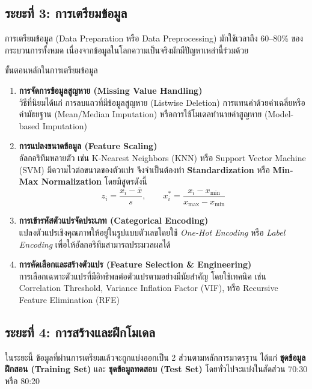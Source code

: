 \subsection{ระยะที่ 3: การเตรียมข้อมูล}
การเตรียมข้อมูล (Data Preparation หรือ Data Preprocessing) มักใช้เวลาถึง 60--80\% ของกระบวนการทั้งหมด เนื่องจากข้อมูลในโลกความเป็นจริงมักมีปัญหาเหล่านี้ร่วมด้วย

\begin{myBox}[]{ขั้นตอนหลักในการเตรียมข้อมูล}{}
\begin{enumerate}
    \item \textbf{การจัดการข้อมูลสูญหาย (Missing Value Handling)} \\
    วิธีที่นิยมได้แก่ การลบแถวที่มีข้อมูลสูญหาย (Listwise Deletion) การแทนค่าด้วยค่าเฉลี่ยหรือค่ามัธยฐาน (Mean/Median Imputation) หรือการใช้โมเดลทำนายค่าสูญหาย (Model-based Imputation)

    \item \textbf{การแปลงขนาดข้อมูล (Feature Scaling)} \\
    อัลกอริทึมหลายตัว เช่น K-Nearest Neighbors (KNN) หรือ Support Vector Machine (SVM) มีความไวต่อขนาดของตัวแปร จึงจำเป็นต้องทำ \textbf{Standardization} หรือ \textbf{Min-Max Normalization} โดยมีสูตรดังนี้
    \[
        z_i = \frac{x_i - \bar{x}}{s}, \qquad
        x_i^{*} = \frac{x_i - x_{\min}}{x_{\max} - x_{\min}}
    \]

    \item \textbf{การเข้ารหัสตัวแปรจัดประเภท (Categorical Encoding)} \\
    แปลงตัวแปรเชิงคุณภาพให้อยู่ในรูปแบบตัวเลขโดยใช้ \textit{One-Hot Encoding} หรือ \textit{Label Encoding} เพื่อให้อัลกอริทึมสามารถประมวลผลได้

    \item \textbf{การคัดเลือกและสร้างตัวแปร (Feature Selection \& Engineering)} \\
    การเลือกเฉพาะตัวแปรที่มีอิทธิพลต่อตัวแปรตามอย่างมีนัยสำคัญ โดยใช้เทคนิค เช่น Correlation Threshold, Variance Inflation Factor (VIF), หรือ Recursive Feature Elimination (RFE)
\end{enumerate}
\end{myBox}

\subsection{ระยะที่ 4: การสร้างและฝึกโมเดล}
ในระยะนี้ ข้อมูลที่ผ่านการเตรียมแล้วจะถูกแบ่งออกเป็น 2 ส่วนตามหลักการมาตรฐาน ได้แก่ \textbf{ชุดข้อมูลฝึกสอน (Training Set)} และ \textbf{ชุดข้อมูลทดสอบ (Test Set)} โดยทั่วไปจะแบ่งในสัดส่วน 70:30 หรือ 80:20

